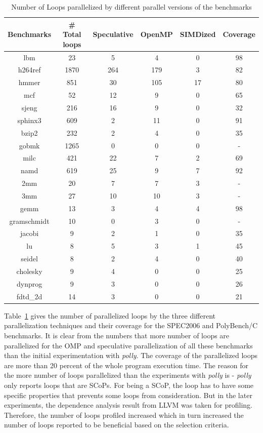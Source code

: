 \documentclass[10pt]{report}          %
\begin{document}
\begin{table}[h]
\centering
\caption{Number of Loops parallelized by different parallel versions of the benchmarks}
\begin{tabular}{|c||c|c|c|c|c|} \hline
Benchmarks & \# Total loops & Speculative & OpenMP & SIMDized & Coverage \\ \hline
lbm & 23 & 5 & 4  &	0 & 98\\ \hline
h264ref & 1870 & 264 & 179 & 3 & 82 \\ \hline
hmmer &	 851	 & 30 & 105 & 17 & 80 \\ \hline
mcf & 52 & 12 & 9 & 0 & 65 \\ \hline
sjeng &	216 & 16	 & 9 & 0 & 32 \\ \hline
sphinx3 & 609 & 2 & 11 & 0 & 91 \\ \hline
bzip2 & 232 & 2 & 4 & 0 & 35 \\ \hline
gobmk & 1265 & 0 & 0 & 0 & - \\ \hline
milc & 421 & 22 & 7 & 2 & 69 \\ \hline
namd & 619 & 25 & 9 & 7 & 92 \\ \hline	
2mm	&20& 7 &7 & 3 & - \\ \hline
3mm	&27& 10&10 & 3 & - \\ \hline	
gemm & 13 & 3 & 4 & 4 & 98 \\ \hline
gramschmidt & 10 & 0 & 3 & 0 & - \\ \hline
jacobi & 9 & 2 & 1 & 0 & 35 \\ \hline
lu & 8 & 5 & 3 & 1 & 45 \\ \hline
seidel & 8 & 2 & 4 & 0 & 40 \\ \hline	
cholesky & 9 & 4 & 0 & 0 & 25 \\ \hline
dynprog & 9 & 3 & 0 & 0 & 26 \\ \hline
fdtd\_2d & 14 & 3 & 0 & 0 & 21 \\ \hline
\hline\end{tabular}
\label{table:coverage_2}
\end{table}

Table~\ref{table:coverage_2} gives the number of parallelized loops by the three different parallelization techniques and their coverage for the SPEC2006 and PolyBench/C benchmarks.  It is clear from the numbers that more number of loops are parallelized for the OMP and speculative parallelization of all these benchmarks than the initial experimentation with \textit{polly}.  The coverage of the parallelized loops are more than 20 percent of the whole program execution time.  The reason for the more number of loops parallelized than the experiments with \textit{polly} is - \textit{polly} only reports loops that are SCoPs.  For being a SCoP, the loop has to have some specific properties that prevents some loops from consideration.  But in the later experiments, the dependence analysis result from LLVM was taken for profiling.  Therefore, the number of loops profiled increased which in turn increased the number of loops reported to be beneficial based on the selection criteria.  \\
\end{document}
